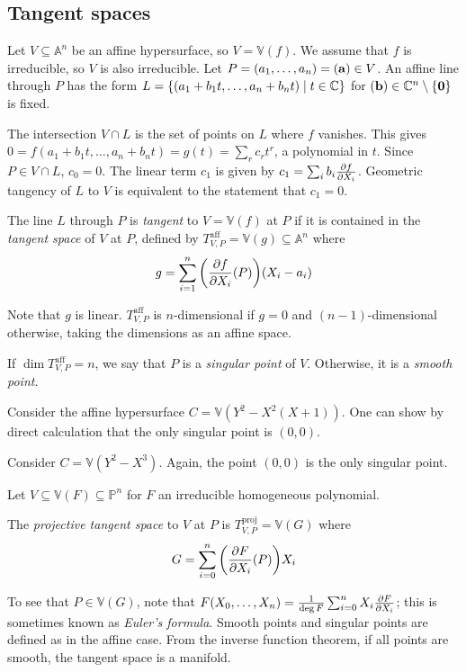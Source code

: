 \subsection{Tangent spaces}
Let \( V \subseteq \mathbb A^n \) be an affine hypersurface, so \( V = \mathbb V(f) \).
We assume that \( f \) is irreducible, so \( V \) is also irreducible.
Let \( P = (a_1, \dots, a_n) = (\vb a) \in V \).
An affine line through \( P \) has the form \( L = \qty{(a_1 + b_1 t, \dots, a_n + b_n t) \mid t \in \mathbb C} \) for \( (\vb b) \in \mathbb C^n \setminus \qty{\vb 0} \) is fixed.

The intersection \( V \cap L \) is the set of points on \( L \) where \( f \) vanishes.
This gives \( 0 = f(a_1 + b_1 t, \dots, a_n + b_n t) = g(t) = \sum_r c_r t^r \), a polynomial in \( t \).
Since \( P \in V \cap L \), \( c_0 = 0 \).
The linear term \( c_1 \) is given by \( c_1 = \sum_i b_i \pdv{f}{X_i}(\vb a) \).
Geometric tangency of \( L \) to \( V \) is equivalent to the statement that \( c_1 = 0 \).
\begin{definition}
    The line \( L \) through \( P \) is \emph{tangent} to \( V = \mathbb V(f) \) at \( P \) if it is contained in the \emph{tangent space} of \( V \) at \( P \), defined by \( T_{V,P}^{\mathrm{aff}} = \mathbb V(g) \subseteq \mathbb A^n \) where
    \[ g = \sum_{i=1}^n \qty(\pdv{f}{X_i}\qty(P))(X_i - a_i) \]
\end{definition}
Note that \( g \) is linear.
\( T_{V,P}^{\mathrm{aff}} \) is \( n \)-dimensional if \( g = 0 \) and \( (n-1) \)-dimensional otherwise, taking the dimensions as an affine space.
\begin{definition}
    If \( \dim T_{V,P}^{\mathrm{aff}} = n \), we say that \( P \) is a \emph{singular point} of \( V \).
    Otherwise, it is a \emph{smooth point}.
\end{definition}
\begin{example}
    Consider the affine hypersurface \( C = \mathbb V(Y^2 - X^2(X+1)) \).
    One can show by direct calculation that the only singular point is \( (0, 0) \).
\end{example}
\begin{example}[cusp]
    Consider \( C = \mathbb V(Y^2 - X^3) \).
    Again, the point \( (0, 0) \) is the only singular point.
\end{example}
Let \( V \subseteq \mathbb V(F) \subseteq \mathbb P^n \) for \( F \) an irreducible homogeneous polynomial.
\begin{definition}
    The \emph{projective tangent space} to \( V \) at \( P \) is \( T_{V,P}^{\mathrm{proj}} = \mathbb V(G) \) where
    \[ G = \sum_{i=0}^n \qty(\pdv{F}{X_i}\qty(P)) X_i \]
\end{definition}
To see that \( P \in \mathbb V(G) \), note that \( F(X_0, \dots, X_n) = \frac{1}{\deg F} \sum_{i=0}^n X_i \pdv{F}{X_i} \); this is sometimes known as \emph{Euler's formula}.
Smooth points and singular points are defined as in the affine case.
From the inverse function theorem, if all points are smooth, the tangent space is a manifold.


